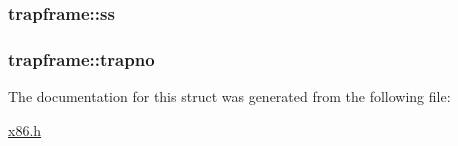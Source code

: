 \subsubsection[{\texorpdfstring{ss}{ss}}]{ trapframe\+::ss}\hypertarget{structtrapframe_aa9c9b52b242d4f42fe4252e26b655bf6}{}\label{structtrapframe_aa9c9b52b242d4f42fe4252e26b655bf6}
\subsubsection[{\texorpdfstring{trapno}{trapno}}]{ trapframe\+::trapno}\hypertarget{structtrapframe_abc7f81b0a6a91d13e9fefe171b0a7d12}{}\label{structtrapframe_abc7f81b0a6a91d13e9fefe171b0a7d12}


The documentation for this struct was generated from the following file\+:\begin{DoxyCompactItemize}
\item 
\hyperlink{x86_8h}{x86.\+h}\end{DoxyCompactItemize}
